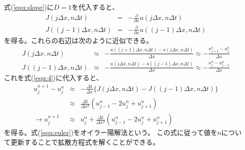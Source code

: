 \documentclass[a4j, titlepage]{jsarticle}
\numberwithin{equation}{section}
\begin{document}
            式(\ref{equ:slope})に$D=1$を代入すると、
            \begin{eqnarray*}
                J(j\Delta x, n\Delta t) &=& -\frac{\partial}{\partial x}u(j\Delta x, n\Delta t) \\
                J((j - 1)\Delta x, n\Delta t) &=& -\frac{\partial}{\partial x}u((j - 1)\Delta x, n\Delta t)
            \end{eqnarray*}
            を得る。これらの右辺は次のように近似できる。
            \begin{eqnarray*}
                J(j\Delta x, n\Delta t) &\approx& -\frac{u((j + 1)\Delta x, n\Delta t) - u(j\Delta x, n\Delta t)}{\Delta x} \approx -\frac{u_{j + 1}^n - u_j^n}{\Delta x} \\
                J((j - 1)\Delta x, n\Delta t) &\approx& -\frac{u(j\Delta x, n\Delta t) - u((j - 1)\Delta x, n\Delta t)}{\Delta x} \approx -\frac{u_j^n - u_{j - 1}^n}{\Delta x}
            \end{eqnarray*}
            これを式(\ref{equ:4})に代入すると、
            \begin{eqnarray}
                u_j^{n + 1} - u_j^n &\approx& -\frac{\Delta t}{\Delta x}\{J(j\Delta x, n\Delta t) - J((j - 1)\Delta x, n\Delta t)\} \nonumber \\
                &\approx& \frac{\Delta t}{\Delta x^2}(u_{j - 1}^n - 2 u_j^n + u_{j + 1}^n) \nonumber \\
                \rightarrow u_j^{n + 1} &\approx& u_j^n + \frac{\Delta t}{\Delta x^2}(u_{j - 1}^n - 2 u_j^n + u_{j + 1}^n) \label{equ:euler}
            \end{eqnarray}
            を得る。式(\ref{equ:euler})をオイラー陽解法という。
            この式に従って値を$n$について更新することで拡散方程式を解くことができる。
\end{document}
